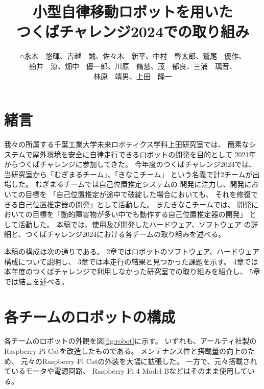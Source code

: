 \documentclass[twocolumn,9pt]{jsproceedings}
\title{小型自律移動ロボットを用いた\\つくばチャレンジ2024での取り組み}
\author{○永木　悠暉\authorrefmark{1}、吉越　誠\authorrefmark{2}、佐々木　新平\authorrefmark{1}、中村　啓太郎\authorrefmark{1}、鷲尾　優作\authorrefmark{1}、
\\船井　涼\authorrefmark{2}、畑中　優一郎\authorrefmark{2}、川原　脩慈\authorrefmark{1}、茂　郁良\authorrefmark{1}、三浦　璃音\authorrefmark{1}、
\\林原　靖男\authorrefmark{1}、上田　隆一\authorrefmark{1}}
\affiliation{千葉工業大学 未来ロボティクス学科 上田研究室 むぎまるチーム/きなこチーム}
\begin{document}
\maketitle


\section{緒言}

我々の所属する千葉工業大学未来ロボティクス学科上田研究室では、
簡素なシステムで屋外環境を安全に自律走行できるロボットの開発を目的として
2021年からつくばチャレンジに参加してきた。
今年度のつくばチャレンジ2024では、
当研究室から「むぎまるチーム」、「きなこチーム」
という名義で計2チームが出場した。
むぎまるチームでは自己位置推定システムの
開発に注力し、開発においての目標を
「自己位置推定が途中で破綻した場合においても、
それを修復できる自己位置推定器の開発」として活動した。
またきなこチームでは、
開発においての目標を「動的障害物が多い中でも動作する自己位置推定器の開発」
として活動した。
本稿では、使用及び開発したハードウェア、ソフトウェア
の詳細と、つくばチャレンジ2024における各チームの取り組みを述べる。

本稿の構成は次の通りである。
2章ではロボットのソフトウェア、ハードウェア構成について説明し、
3章では本走行の結果と見つかった課題を示す。
4章では本年度のつくばチャレンジで利用しなかった研究室での取り組みを紹介し、
5章では結言を述べる。

\section{各チームのロボットの構成}
各チームのロボットの外観を図\ref{fig:robot}に示す。
いずれも、アールティ社製の
Raspberry Pi Cat\cite{RTshop}を改造したものである。
メンテナンス性と搭載量の向上のため、
元々のRaspberry Pi Catの外装を大幅に拡張した。
一方で、元々搭載されているモータや電源回路、
Raspberry Pi 4 Model Bなどはそのまま使用している。
\end{document}

